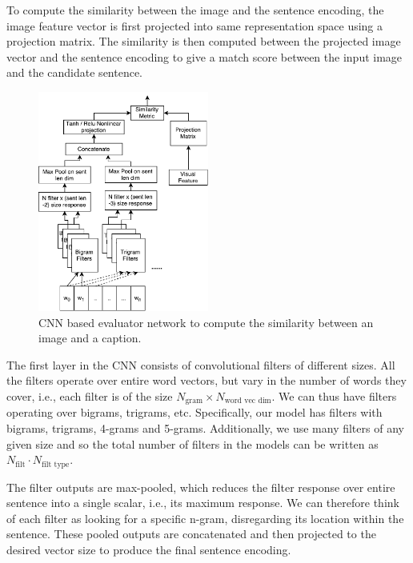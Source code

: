 To compute the similarity between the image and the sentence encoding,
the image feature vector is first projected into same representation
space using a projection matrix.
The similarity is then computed between the projected image vector and
the sentence encoding to give a match score between the input image
and the candidate sentence.

\begin{figure}[t] 
  \centering
  \includegraphics[width=0.5\textwidth]{./images/CnnEval.pdf} 
  \caption{CNN based evaluator network to compute the similarity between 
    an image and a caption.}
  \label{fig:CNNEval} 
\end{figure}


The first layer in the CNN consists of convolutional filters of
different sizes.  
All the filters operate over entire word vectors, but vary in the
number of words they cover, i.e., each filter is of the size
$N_{\text{gram}} \times N_{\text{word vec dim}}$. 
We can thus have filters operating over bigrams, trigrams, etc.
Specifically, our model has filters with bigrams, trigrams, 4-grams and
5-grams. 
Additionally, we use many filters of any given size and so the total
number of filters in the models can be written as
$N_{\text{filt}} \cdot N_{\text{filt type}}$.

The filter outputs are max-pooled, which reduces the filter response
over entire sentence into a single scalar, i.e., its maximum
response. 
We can therefore think of each filter as looking for a specific
n-gram, disregarding its location within the sentence.
These pooled outputs are concatenated and then projected to the
desired vector size to produce the final sentence encoding.

